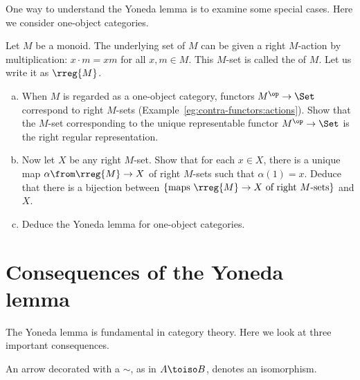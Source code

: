 \begin{question}
One way to understand the Yoneda lemma is to examine some special
cases.  Here we consider one-object%
%
%
%
categories.

Let $M$ be a monoid.  The underlying set of $M$ can be given a right
$M$-action by multiplication: $x \cdot m = xm$ for all $x, m \in M$.  This
$M$-set is called the  of $M$.  Let us write it as $\rreg{M}$.

\begin{enumerate}[(b)]
\item 
When $M$ is regarded as a one-object category, functors $M^\op \to \Set$
correspond to right $M$-sets (Example~\ref{eg:contra-functors:actions}).
Show that the $M$-set corresponding to the unique representable functor
$M^\op \to \Set$ is the right regular representation.

\item 
Now let $X$ be any right $M$-set.  Show that for each $x \in X$, there is a
unique map $\alpha\from \rreg{M} \to X$ of right $M$-sets such that
$\alpha(1) = x$.  Deduce that there is a bijection between $ \{ \text{maps
} \rreg{M} \to X \text{ of right }M\text{-sets} \} $ and $X$.

\item 
Deduce the Yoneda lemma for one-object categories.  
\end{enumerate}
\end{question}



\section{Consequences of the Yoneda lemma}


The Yoneda lemma is fundamental in category theory.  Here we look at three
important consequences.

\begin{notn}
An arrow decorated with a $\sim$, as in $A \toiso B$,%
%
%
 denotes an isomorphism.
\end{notn}


%
%

